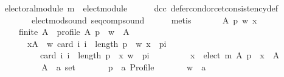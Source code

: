 \begin{isabellebody}
\ \ \isamarkupfalse%
\ {\isachardoublequoteopen}electoral{\isacharunderscore}{\kern0pt}module\ {\isacharparenleft}{\kern0pt}m\ {\isasymtriangleright}\ elect{\isacharunderscore}{\kern0pt}module{\isacharparenright}{\kern0pt}{\isachardoublequoteclose}\isanewline
\ \ \ \ \isamarkupfalse%
\ dcc\ defer{\isacharunderscore}{\kern0pt}condorcet{\isacharunderscore}{\kern0pt}consistency{\isacharunderscore}{\kern0pt}def\isanewline
\ \ \ \ \ \ \ \ \ \ elect{\isacharunderscore}{\kern0pt}mod{\isacharunderscore}{\kern0pt}sound\ seq{\isacharunderscore}{\kern0pt}comp{\isacharunderscore}{\kern0pt}sound\isanewline
\ \ \ \ \isamarkupfalse%
\ metis\isanewline
{}\isamarkupfalse%
\isanewline
\ \ \isamarkupfalse%
\isanewline
\ \ \ \ {\isachardoublequoteopen}{\isasymAnd}A\ p\ w\ x{\isachardot}{\kern0pt}\isanewline
\ \ \ \ \ \ \ finite\ A\ {\isasymLongrightarrow}\ profile\ A\ p\ {\isasymLongrightarrow}\ w\ {\isasymin}\ A\ {\isasymLongrightarrow}\isanewline
\ \ \ \ \ \ \ \ \ {\isasymforall}x{\isasymin}A\ {\isacharminus}{\kern0pt}\ {\isacharbraceleft}{\kern0pt}w{\isacharbraceright}{\kern0pt}{\isachardot}{\kern0pt}\ card\ {\isacharbraceleft}{\kern0pt}i{\isachardot}{\kern0pt}\ i\ {\isacharless}{\kern0pt}\ length\ p\ {\isasymand}\ {\isacharparenleft}{\kern0pt}w{\isacharcomma}{\kern0pt}\ x{\isacharparenright}{\kern0pt}\ {\isasymin}\ {\isacharparenleft}{\kern0pt}p{\isacharbang}{\kern0pt}i{\isacharparenright}{\kern0pt}{\isacharbraceright}{\kern0pt}\ {\isacharless}{\kern0pt}\isanewline
\ \ \ \ \ \ \ \ \ \ \ \ card\ {\isacharbraceleft}{\kern0pt}i{\isachardot}{\kern0pt}\ i\ {\isacharless}{\kern0pt}\ length\ p\ {\isasymand}\ {\isacharparenleft}{\kern0pt}x{\isacharcomma}{\kern0pt}\ w{\isacharparenright}{\kern0pt}\ {\isasymin}\ {\isacharparenleft}{\kern0pt}p{\isacharbang}{\kern0pt}i{\isacharparenright}{\kern0pt}{\isacharbraceright}{\kern0pt}\ {\isasymLongrightarrow}\isanewline
\ \ \ \ \ \ \ \ x\ {\isasymin}\ elect\ m\ A\ p\ {\isasymLongrightarrow}\ x\ {\isasymin}\ A{\isachardoublequoteclose}\isanewline
\ \ \isamarkupfalse%
\ {\isacharminus}{\kern0pt}\isanewline
\ \ \ \ \isamarkupfalse%
\isanewline
\ \ \ \ \ \ A\ {\isacharcolon}{\kern0pt}{\isacharcolon}{\kern0pt}\ {\isachardoublequoteopen}{\isacharprime}{\kern0pt}a\ set{\isachardoublequoteclose}\ \isanewline
\ \ \ \ \ \ p\ {\isacharcolon}{\kern0pt}{\isacharcolon}{\kern0pt}\ {\isachardoublequoteopen}{\isacharprime}{\kern0pt}a\ Profile{\isachardoublequoteclose}\ \isanewline
\ \ \ \ \ \ w\ {\isacharcolon}{\kern0pt}{\isacharcolon}{\kern0pt}\ {\isachardoublequoteopen}{\isacharprime}{\kern0pt}a{\isachardoublequoteclose}\ \isanewline

\end{isabellebody}
